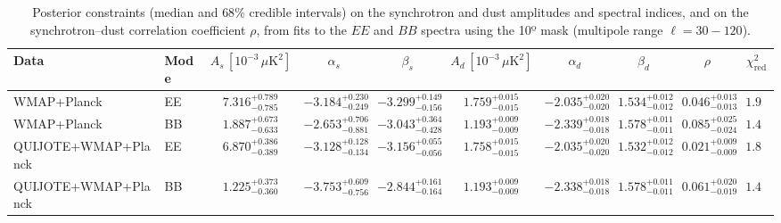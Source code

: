 \begin{table}[h]
\centering
\scriptsize
\setlength{\tabcolsep}{4pt}
\caption{Posterior constraints (median and $68\%$ credible intervals) on the synchrotron and dust amplitudes and spectral indices, and on the synchrotron--dust correlation coefficient $\rho$, from fits to the $EE$ and $BB$ spectra using the 10º mask (multipole range $\ell=30-120$).}
\label{tab:fit_no_QQ_autos_ell30-120}
\begin{tabular}{llcccccccc}
\toprule
Data & Mode & $A_s\,[10^{-3}\,\mu\mathrm{K}^2]$ & $\alpha_s$ & $\beta_s$ & $A_d\,[10^{-3}\,\mu\mathrm{K}^2]$ & $\alpha_d$ & $\beta_d$ & $\rho$ & $\chi^2_\mathrm{red}$ \\
\midrule
WMAP+Planck & EE & $7.316^{+0.789}_{-0.785}$ & $-3.184^{+0.230}_{-0.249}$ & $-3.299^{+0.149}_{-0.156}$ & $1.759^{+0.015}_{-0.015}$ & $-2.035^{+0.020}_{-0.020}$ & $1.534^{+0.012}_{-0.012}$ & $0.046^{+0.013}_{-0.013}$ & $1.99$ \\
WMAP+Planck & BB & $1.887^{+0.673}_{-0.633}$ & $-2.653^{+0.706}_{-0.881}$ & $-3.043^{+0.364}_{-0.428}$ & $1.193^{+0.009}_{-0.009}$ & $-2.339^{+0.018}_{-0.018}$ & $1.578^{+0.011}_{-0.011}$ & $0.085^{+0.025}_{-0.024}$ & $1.47$ \\
QUIJOTE+WMAP+Planck & EE & $6.870^{+0.386}_{-0.389}$ & $-3.128^{+0.128}_{-0.134}$ & $-3.156^{+0.055}_{-0.056}$ & $1.758^{+0.015}_{-0.015}$ & $-2.035^{+0.020}_{-0.020}$ & $1.532^{+0.012}_{-0.012}$ & $0.021^{+0.009}_{-0.009}$ & $1.89$ \\
QUIJOTE+WMAP+Planck & BB & $1.225^{+0.373}_{-0.360}$ & $-3.753^{+0.609}_{-0.756}$ & $-2.844^{+0.161}_{-0.164}$ & $1.193^{+0.009}_{-0.009}$ & $-2.338^{+0.018}_{-0.018}$ & $1.578^{+0.011}_{-0.011}$ & $0.061^{+0.020}_{-0.019}$ & $1.46$ \\
\bottomrule
\end{tabular}
\end{table}